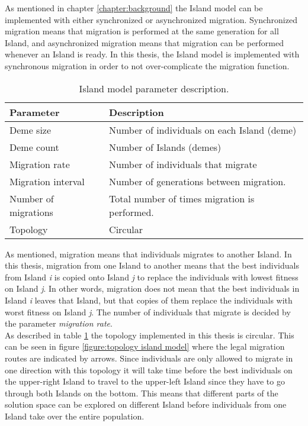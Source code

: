 \noindent As mentioned in chapter \ref{chapter:background} the Island model can be implemented with either synchronized or asynchronized migration. Synchronized migration means that migration is performed at the same generation for all Island, and asynchronized migration means that migration can be performed whenever an Island is ready. In this thesis, the Island model is implemented with synchronous migration in order to not over-complicate the migration function.\\


\begin{table}[h!]
    \centering
    \caption{Island model parameter description.}
    \label{table:parameter description island model}
        \begin{tabular}{l|l}
         \textbf{Parameter} & \textbf{Description}  \\
         \hline
         Deme size  & Number of individuals on each Island (deme) \\
         Deme count & Number of Islands (demes) \\
         Migration rate & Number of individuals that migrate \\
         Migration interval & Number of generations between migration. \\
         Number of migrations & Total number of times migration is performed. \\
         Topology & Circular
    \end{tabular}
\end{table}


\noindent As mentioned, migration means that individuals migrates to another Island. In this thesis, migration from one Island to another means that the best individuals from Island \textit{i} is copied onto Island \textit{j} to replace the individuals with lowest fitness on Island \textit{j}. In other words, migration does not mean that the best individuals in Island \textit{i} leaves that Island, but that copies of them replace the individuals with worst fitness on Island \textit{j}. The number of individuals that migrate is decided by the parameter \textit{migration rate}.\\


\noindent As described in table \ref{table:parameter description island model} the topology implemented in this thesis is circular. This can be seen in figure \ref{figure:topology island model} where the legal migration routes are indicated by arrows. Since individuals are only allowed to migrate in one direction with this topology it will take time before the best individuals on the upper-right Island to travel to the upper-left Island since they have to go through both Islands on the bottom. This means that different parts of the solution space can be explored on different Island before individuals from one Island take over the entire population.


